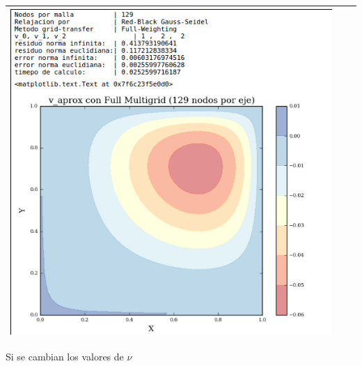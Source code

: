 \documentclass[letter,10pt]{article}
\begin{document}
\begin{table}[H]
\begin{tabular}[t]{|c|c|c|}
\includegraphics[scale=0.38]{img/fmg/mgRBGS129NFW} \\ \hline

\end{tabular}

\label{cualitmg221}
\end{table}

Si se cambian los valores de $\nu$
\end{document}
